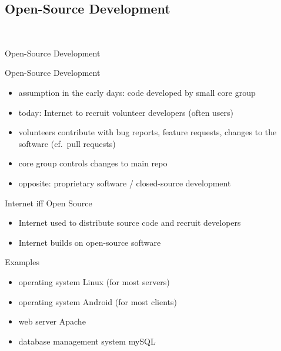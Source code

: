 \subsection{Open-Source Development}
\begin{frame}{\insertsubsection\ \mytitlesource{\sommerville}} %
	\begin{fancycolumns}
		\begin{definition}{Open-Source Development}
		\end{definition}
		\begin{note}{Open-Source Development}
			\begin{itemize}
				\setlength\itemsep{.0em}
				\item assumption in the early days: code developed by small core group
				\item today: Internet to recruit volunteer developers (often users)
				\item volunteers contribute with bug reports, feature requests, changes to the software (cf.\ pull requests)
				\item core group controls changes to main repo
				\item opposite: proprietary software / closed-source development
			\end{itemize}
		\end{note}
		\nextcolumn
		\begin{note}{Internet iff Open Source}
			\begin{itemize}
				\setlength\itemsep{.0em}
				\item Internet used to distribute source code and recruit developers
				\item Internet builds on open-source software
			\end{itemize}
		\end{note}
		\begin{example}{Examples} %
			\begin{itemize}
				\setlength\itemsep{.0em}
				\item operating system Linux (for most servers)
				\item operating system Android (for most clients)
				\item web server Apache
				\item database management system mySQL

\end{itemize}
\end{example}
\end{fancycolumns}
\end{frame}

